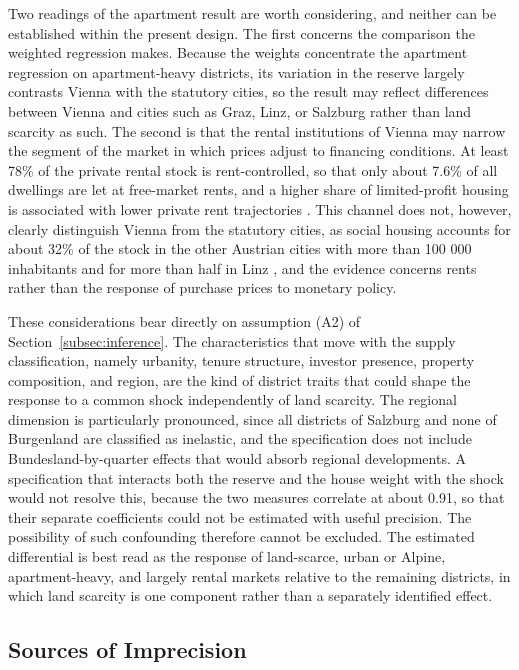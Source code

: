 \documentclass[a4paper,12pt, headsepline]{scrartcl}
\numberwithin{equation}{section}
\begin{document}
Two readings of the apartment result are worth considering, and neither can be established within the present design. The first concerns the comparison the weighted regression makes. Because the weights concentrate the apartment regression on apartment-heavy districts, its variation in the reserve largely contrasts Vienna with the statutory cities, so the result may reflect differences between Vienna and cities such as Graz, Linz, or Salzburg rather than land scarcity as such. The second is that the rental institutions of Vienna may narrow the segment of the market in which prices adjust to financing conditions. At least 78\% of the private rental stock is rent-controlled, so that only about 7.6\% of all dwellings are let at free-market rents, and a higher share of limited-profit housing is associated with lower private rent trajectories \citep{banabak2022}. This channel does not, however, clearly distinguish Vienna from the statutory cities, as social housing accounts for about 32\% of the stock in the other Austrian cities with more than 100 000 inhabitants and for more than half in Linz \citep{kadi2022}, and the evidence concerns rents rather than the response of purchase prices to monetary policy.

These considerations bear directly on assumption (A2) of Section~\ref{subsec:inference}. The characteristics that move with the supply classification, namely urbanity, tenure structure, investor presence, property composition, and region, are the kind of district traits that could shape the response to a common shock independently of land scarcity. The regional dimension is particularly pronounced, since all districts of Salzburg and none of Burgenland are classified as inelastic, and the specification does not include Bundesland-by-quarter effects that would absorb regional developments. A specification that interacts both the reserve and the house weight with the shock would not resolve this, because the two measures correlate at about 0.91, so that their separate coefficients could not be estimated with useful precision. The possibility of such confounding therefore cannot be excluded. The estimated differential is best read as the response of land-scarce, urban or Alpine, apartment-heavy, and largely rental markets relative to the remaining districts, in which land scarcity is one component rather than a separately identified effect.

\subsection{Sources of Imprecision}\label{subsec:imprecision}
\end{document}
